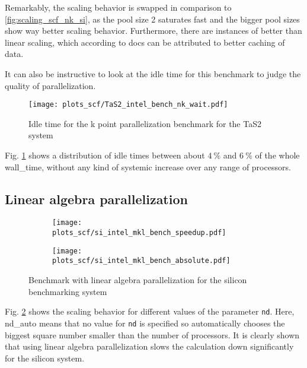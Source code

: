 \documentclass[main.tex]{subfiles}
\begin{document}
Remarkably, the scaling behavior is swapped in comparison to \ref{fig:scaling_scf_nk_si}, as the pool size 2 saturates fast and the bigger pool sizes show way better scaling behavior.
Furthermore, there are instances of better than linear scaling, which according to \QE docs can be attributed to better caching of data.

It can also be instructive to look at the idle time for this benchmark to judge the quality of parallelization. 

\begin{figure}[ht!]
    \centering
    \texttt{[image: plots\_scf/TaS2\_intel\_bench\_nk\_wait.pdf]}
    \caption{Idle time for the k point parallelization benchmark for the TaS2 system}
    \label{fig:scaling_scf_nk_tas2_wait}
\end{figure}

Fig. \ref{fig:scaling_scf_nk_tas2_wait} shows a distribution of idle times between about \(\SI{4}{\percent}\) and \(\SI{6}{\percent}\) of the whole \gls{wall_time}, without any kind of systemic increase over any range of processors.

\subsection{Linear algebra parallelization}

\begin{figure}[ht!]
\begin{subfigure}[b]{0.49\textwidth}
    \centering
    \texttt{[image: plots\_scf/si\_intel\_mkl\_bench\_speedup.pdf]}
\end{subfigure}
\begin{subfigure}[b]{0.49\textwidth}
    \centering
    \texttt{[image: plots\_scf/si\_intel\_mkl\_bench\_absolute.pdf]}
\end{subfigure}
\label{fig:scaling_scf_nd_si}
\caption{Benchmark with linear algebra parallelization for the silicon benchmarking system}
\end{figure}

Fig. \ref{fig:scaling_scf_nd_si} shows the scaling behavior for different values of the parameter \texttt{nd}.
Here, nd\_auto means that no value for \texttt{nd} is specified so \QE automatically chooses the biggest square number smaller than the number of processors.
It is clearly shown that using linear algebra parallelization slows the calculation down significantly for the silicon system.
\end{document}
